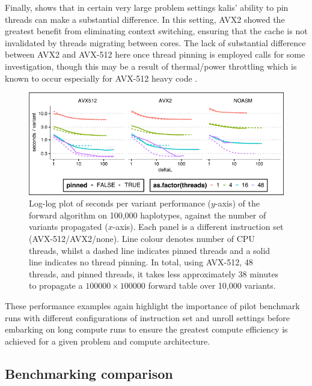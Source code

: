 \documentclass[pdflatex,referee,lineno,sn-nature]{sn-jnl}%
\newcommand{\pkg}[1]{{\fontseries{m}\fontseries{b}\selectfont #1}}
\begin{document}
Finally,  shows that in certain very large problem settings \pkg{kalis}' ability to pin threads can make a substantial difference.
In this setting, AVX2 showed the greatest benefit from eliminating context switching, ensuring that the cache is not invalidated by threads migrating between cores.
The lack of substantial difference between AVX2 and AVX-512 here once thread pinning is employed calls for some investigation, though this may be a result of thermal/power throttling which is known to occur especially for AVX-512 heavy code \citep{schone2019energy}.

\begin{figure}
  \centering
  \includegraphics{fig4}
	\caption{
	  Log-log plot of seconds per variant performance ($y$-axis) of the forward algorithm on 100,000 haplotypes, against the number of variants propagated ($x$-axis).
	  Each panel is a different instruction set (AVX-512/AVX2/none).
	  Line colour denotes number of CPU threads, whilst a dashed line indicates pinned threads and a solid line indicates no thread pinning.
	  In total, using AVX-512, 48 threads, and pinned threads, it takes less approximately 38 minutes to propagate a $100000 \times 100000$ forward table over 10,000 variants.
	}
	\label{fig:perfdeltaL2}
\end{figure}

These performance examples again highlight the importance of pilot benchmark runs with different configurations of instruction set and unroll settings before embarking on long compute runs to ensure the greatest compute efficiency is achieved for a given problem and compute architecture.

\subsection*{Benchmarking comparison}
\end{document}
